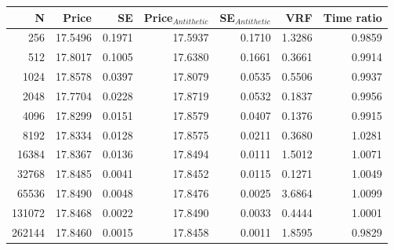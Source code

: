 \begin{tabular}{rrrrrrr}
\toprule
N & Price & SE & Price$_{Antithetic}$ & SE$_{Antithetic}$ & VRF & Time ratio \\
\midrule
256 & 17.5496 & 0.1971 & 17.5937 & 0.1710 & 1.3286 & 0.9859 \\
512 & 17.8017 & 0.1005 & 17.6380 & 0.1661 & 0.3661 & 0.9914 \\
1024 & 17.8578 & 0.0397 & 17.8079 & 0.0535 & 0.5506 & 0.9937 \\
2048 & 17.7704 & 0.0228 & 17.8719 & 0.0532 & 0.1837 & 0.9956 \\
4096 & 17.8299 & 0.0151 & 17.8579 & 0.0407 & 0.1376 & 0.9915 \\
8192 & 17.8334 & 0.0128 & 17.8575 & 0.0211 & 0.3680 & 1.0281 \\
16384 & 17.8367 & 0.0136 & 17.8494 & 0.0111 & 1.5012 & 1.0071 \\
32768 & 17.8485 & 0.0041 & 17.8452 & 0.0115 & 0.1271 & 1.0049 \\
65536 & 17.8490 & 0.0048 & 17.8476 & 0.0025 & 3.6864 & 1.0099 \\
131072 & 17.8468 & 0.0022 & 17.8490 & 0.0033 & 0.4444 & 1.0001 \\
262144 & 17.8460 & 0.0015 & 17.8458 & 0.0011 & 1.8595 & 0.9829 \\
\bottomrule
\end{tabular}
